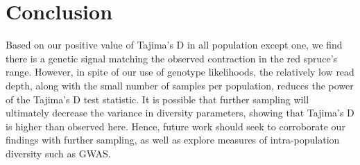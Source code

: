 \documentclass[11pt]{scrartcl}
\begin{document}
\section{Conclusion}
\label{sec:conclusion}

Based on our positive value of Tajima's D in all population except
one, we find there is a genetic signal matching the observed
contraction in the red spruce's range. However, in spite of our use of
genotype likelihoods, the relatively low read depth, along with the
small number of samples per population, reduces the power of the
Tajima's D test statistic. It is possible that further sampling will
ultimately decrease the variance in diversity parameters, showing that
Tajima's D is higher than observed here. Hence, future work should
seek to corroborate our findings with further sampling, as well as
explore measures of intra-population diversity such as GWAS.

\newpage



\end{document}

